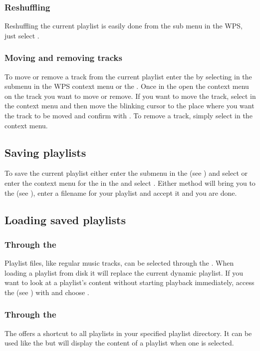 \subsubsection{Reshuffling}
Reshuffling the current playlist is easily done from the 
sub menu in the WPS, just select .

\subsubsection{Moving and removing tracks}
To move or remove a track from the current playlist enter the
 by selecting  in the
 submenu in the WPS context menu or the .
Once in the  open the context menu on the track you
want to move or remove. If you want to move the track, select  in
the context menu and then move the blinking cursor to the place where you want
the track to be moved and confirm with \ActionStdOk. To remove a track, simply
select  in the context menu.

\subsection{Saving playlists}
To save the current playlist either enter the  submenu
in the  (see ) and
select  or enter the context menu for the
 in the  and select
.
Either method will bring you to the  (see
), enter a filename for your playlist and
accept it and you are done.

\subsection{Loading saved playlists}
\subsubsection{Through the }
Playlist files, like regular music tracks, can be selected through the
. When loading a playlist from disk it will replace
the current dynamic playlist. If you want to look at a playlist's
content without starting playback immediately, access the  (see
) with \ActionStdContext{} and choose .

\subsubsection{Through the }
The  offers a shortcut to all playlists in your
\daps{} specified playlist directory.
It can be used like the  but will display
the content of a playlist when one is selected.

